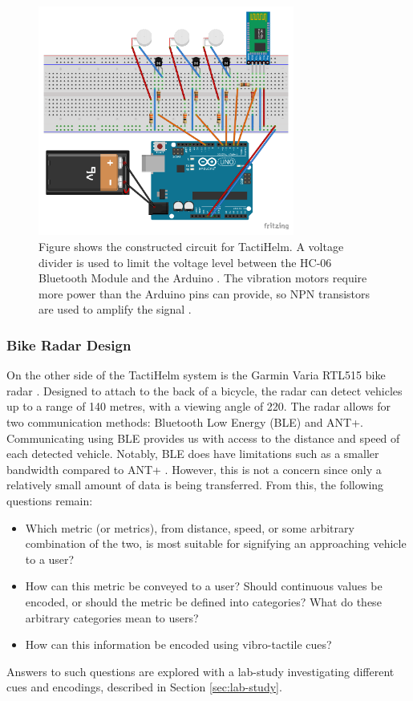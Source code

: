 \documentclass{interim}
\begin{document}
\begin{figure}[!ht]
    \centering
    \includegraphics[width=0.75\textwidth]{images/circuit-design_bb.pdf}
    \caption{Figure shows the constructed circuit for TactiHelm. A voltage divider is used to limit the voltage level between the HC-06 Bluetooth Module and the Arduino \cite{bluetoothmodule}. The vibration motors require more power than the Arduino pins can provide, so NPN transistors are used to amplify the signal \cite{vibrationmotor}.}
    \label{fig:circuit}
\end{figure}


\subsubsection{Bike Radar Design}
On the other side of the TactiHelm system is the Garmin Varia RTL515 bike radar \cite{garminradar}. Designed to attach to the back of a bicycle, the radar can detect vehicles up to a range of 140 metres, with a viewing angle of 220\degree{}. The radar allows for two communication methods: Bluetooth Low Energy (BLE) and ANT+. Communicating using BLE provides us with access to the distance and speed of each detected vehicle. Notably, BLE does have limitations such as a smaller bandwidth compared to ANT+ \cite{bluetoothlimitations}. However, this is not a concern since only a relatively small amount of data is being transferred. From this, the following questions remain:
\begin{itemize}
    \item Which metric (or metrics), from distance, speed, or some arbitrary combination of the two, is most suitable for signifying an approaching vehicle to a user?
    \item How can this metric be conveyed to a user? Should continuous values be encoded, or should the metric be defined into categories? What do these arbitrary categories mean to users? 
    \item How can this information be encoded using vibro-tactile cues?
\end{itemize}
Answers to such questions are explored with a lab-study investigating different cues and encodings, described in Section \ref{sec:lab-study}.
\end{document}

